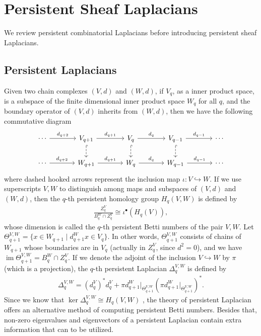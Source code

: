 \documentclass[11pt]{article}
\DeclareMathOperator{\im}{im}
\theoremstyle{definition}
\theoremstyle{definition}
\begin{document}
\section{Persistent Sheaf Laplacians} \label{persistent sheaf laplacian}

We review persistent combinatorial Laplacians before introducing persistent sheaf Laplacians. 

\subsection{Persistent Laplacians}

Given two chain complexes $(V,d)$ and $(W,d)$, if $V_q$, as a inner product space, is a subspace of the finite dimensional inner product space $W_q$ for all $q$, 
and the boundary operator of $(V,d)$ inherits from $(W,d)$,
then we have the following commutative diagram
\[
    \begin{tikzcd}[column sep = large]
        \cdots \arrow[r, "d_{q+2}"]
        & V_{q+1} \arrow[r, "d_{q+1}"] \arrow[d, hook, dashed] 
          & V_{q} \arrow[r, "d_q"] \arrow[d, hook, dashed] 
            & V_{q-1} \arrow[r, "d_{q-1}"] \arrow[d, dashed, hook]
              & \cdots
            \\
        \cdots \arrow[r, "d_{q+2}"]
        & W_{q+1} \arrow[r, "d_{q+1}"] 
          & W_q \arrow[r, "d_q"] 
            & W_{q-1} \arrow[r, "d_{q-1}"]
              & \cdots 
    \end{tikzcd}
\]
where dashed hooked arrows represent the inclusion map $\iota: V \hookrightarrow W$.
If we use superscripts $V,W$ to distinguish among maps and subspaces of $(V,d)$ and $(W,d)$, 
then the $q$-th persistent homology group $H_q(V,W)$ is defined by 
\begin{align*}
    \frac{Z^V_q}{B_q^W \cap Z_q^V} \cong \iota^{\bullet} (H_q(V)),
\end{align*}
whose dimension is called the $q$-th persistent Betti numbers of the pair $V,W$.
Let $\Theta_{q+1}^{V,W} = \{x \in W_{q+1} \mid d_{q+1}^Wx \in V_q \}$. 
In other words, $\Theta_{q+1}^{V,W}$ consists of chains of $W_{q+1}$ whose boundaries are in $V_q$ (actually in $Z^V_q$, since $d^2=0$),
and we have $\im \Theta_{q+1}^{V,W}=B_q^W \cap Z_q^V$. 
If we denote the adjoint of the inclusion $V\hookrightarrow W$ by $\pi$ (which is a projection), 
the $q$-th persistent Laplacian $\Delta_q^{V,W}$ \cite{liu2023algebraic, memoli2022persistent, wang2020persistent} is defined by 
\begin{align*}
    \Delta_q^{V,W} = (d_{q}^V)^{\ast}d_q^V + \pi d_{q+1}^W\vert_{\Theta_{q+1}^{V,W}} (\pi d_{q+1}^W\vert_{\Theta_{q+1}^{V,W}})^{\ast}.
\end{align*}
Since we know that $\ker \Delta_q^{V,W} \cong H_q(V,W)$ \cite{liu2023algebraic, memoli2022persistent, wang2020persistent},
the theory of persistent Laplacian offers an alternative method of computing persistent Betti numbers. 
Besides that, non-zero eigenvalues and eigenvectors of a persistent Laplacian contain extra information that can to be utilized.
\end{document}
